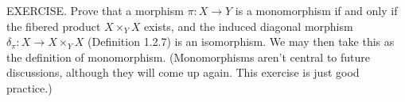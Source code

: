 EXERCISE. Prove that a morphism $\pi:X\to Y$ is a monomorphism if and only if the fibered product $X\times_YX$ exists, and the induced diagonal morphism $\delta_\pi:X\to X\times_YX$ (Definition 1.2.7) is an isomorphism. We may then take this as the definition of monomorphism. (Monomorphisms aren’t central to future discussions, although they will come up again. This exercise is just good practice.)
